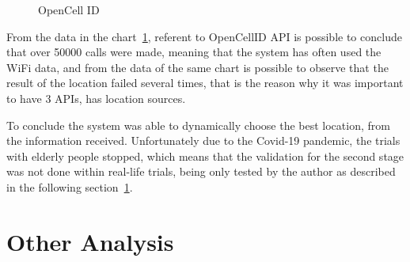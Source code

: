 \begin{figure}[htbp]
  \centering
  \caption{OpenCell ID}
  \label{fig:OpennCellID_chart}
\end{figure}




From the data  in the chart~\ref{fig:OpennCellID_chart}, referent to OpenCellID API is possible to conclude that over 50000 calls were made, meaning that the system has often used the WiFi data, and from the data of the same chart is possible to observe that the result of the location failed several times, that is the reason  why it was important to have 3 APIs, has location sources.

To conclude the system was able to dynamically choose the best location, from the information received. Unfortunately due to the Covid-19 pandemic, the trials with elderly people stopped, which means that the validation for the second stage was not done within real-life trials, being only tested by the author as described in the following section~\ref{sec:Other Analysis}.








\newpage
\section{Other Analysis}
\label{sec:Other Analysis}

